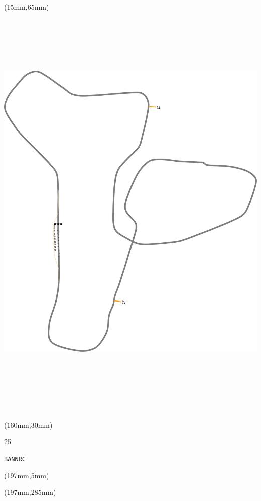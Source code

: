 \begin{textblock*}{185mm}(15mm,65mm)%
\centering
\mbox{\includegraphics[width=185mm,height=210mm,keepaspectratio]{PT/BANNRC.pdf}}
\end{textblock*}
\begin{textblock*}{40mm}(160mm,30mm)%
\Large
\par{} 
\par25 
\par\hfill\tiny\tt BANNRC\\
\end{textblock*}
\begin{textblock*}{20mm}(197mm,5mm)%
\fbox{\thepage}
\label{BANNRC}
\end{textblock*}
\begin{textblock*}{20mm}(197mm,285mm)%
\fbox{\thepage}
\end{textblock*}

